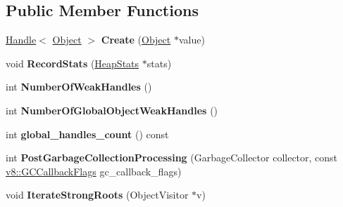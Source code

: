 \subsection*{Public Member Functions}
\begin{DoxyCompactItemize}
\item 
\hyperlink{classv8_1_1internal_1_1_handle}{Handle}$<$ \hyperlink{classv8_1_1internal_1_1_object}{Object} $>$ {\bfseries Create} (\hyperlink{classv8_1_1internal_1_1_object}{Object} $\ast$value)\hypertarget{classv8_1_1internal_1_1_global_handles_af195ba8f98e17aab81b643cecbc60f0a}{}\label{classv8_1_1internal_1_1_global_handles_af195ba8f98e17aab81b643cecbc60f0a}

\item 
void {\bfseries Record\+Stats} (\hyperlink{classv8_1_1internal_1_1_heap_stats}{Heap\+Stats} $\ast$stats)\hypertarget{classv8_1_1internal_1_1_global_handles_a0f347ad922f1883463494e754d702699}{}\label{classv8_1_1internal_1_1_global_handles_a0f347ad922f1883463494e754d702699}

\item 
int {\bfseries Number\+Of\+Weak\+Handles} ()\hypertarget{classv8_1_1internal_1_1_global_handles_a5dc0535cb6f4748bee2dd481d66c68d4}{}\label{classv8_1_1internal_1_1_global_handles_a5dc0535cb6f4748bee2dd481d66c68d4}

\item 
int {\bfseries Number\+Of\+Global\+Object\+Weak\+Handles} ()\hypertarget{classv8_1_1internal_1_1_global_handles_a847a0f050798a343f8f961cf6b0e9aea}{}\label{classv8_1_1internal_1_1_global_handles_a847a0f050798a343f8f961cf6b0e9aea}

\item 
int {\bfseries global\+\_\+handles\+\_\+count} () const \hypertarget{classv8_1_1internal_1_1_global_handles_a70def1becf756e921dd90918f964a443}{}\label{classv8_1_1internal_1_1_global_handles_a70def1becf756e921dd90918f964a443}

\item 
int {\bfseries Post\+Garbage\+Collection\+Processing} (Garbage\+Collector collector, const \hyperlink{namespacev8_a247c37a849f4d6c293b9b16e94e1944b}{v8\+::\+G\+C\+Callback\+Flags} gc\+\_\+callback\+\_\+flags)\hypertarget{classv8_1_1internal_1_1_global_handles_a7191d3b6218e05993443fbd7ad5908c6}{}\label{classv8_1_1internal_1_1_global_handles_a7191d3b6218e05993443fbd7ad5908c6}

\item 
void {\bfseries Iterate\+Strong\+Roots} (Object\+Visitor $\ast$v)\hypertarget{classv8_1_1internal_1_1_global_handles_a882faa9f4089ce42b4ba2dd3b0aa3fdc}{}\label{classv8_1_1internal_1_1_global_handles_a882faa9f4089ce42b4ba2dd3b0aa3fdc}


\end{DoxyCompactItemize}
